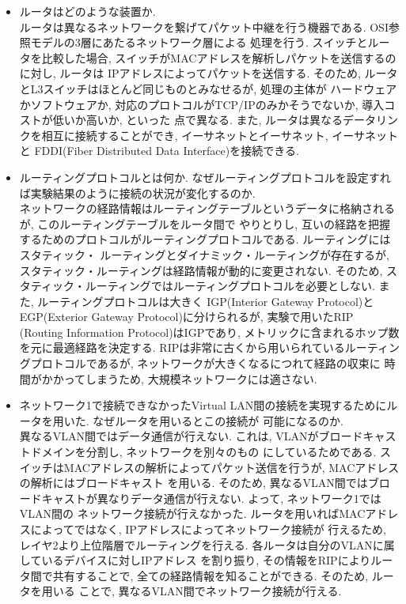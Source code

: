 \documentclass{jsarticle}
\begin{document}
\begin{itemize}
	\item ルータはどのような装置か. \\
		ルータは異なるネットワークを繋げてパケット中継を行う機器である. OSI参照モデルの3層にあたるネットワーク層による
		処理を行う. スイッチとルータを比較した場合, スイッチがMACアドレスを解析しパケットを送信するのに対し, ルータは
		IPアドレスによってパケットを送信する. そのため, ルータとL3スイッチはほとんど同じものとみなせるが, 処理の主体が
		ハードウェアかソフトウェアか, 対応のプロトコルがTCP/IPのみかそうでないか, 導入コストが低いか高いか, といった
		点で異なる. また, ルータは異なるデータリンクを相互に接続することができ, イーサネットとイーサネット, イーサネットと
		FDDI(Fiber Distributed Data Interface)を接続できる. \\
	
	\item ルーティングプロトコルとは何か. なぜルーティングプロトコルを設定すれば実験結果のように接続の状況が変化するのか. \\
		ネットワークの経路情報はルーティングテーブルというデータに格納されるが, このルーティングテーブルをルータ間で
		やりとりし, 互いの経路を把握するためのプロトコルがルーティングプロトコルである. ルーティングにはスタティック・
		ルーティングとダイナミック・ルーティングが存在するが, スタティック・ルーティングは経路情報が動的に変更されない. 
		そのため, スタティック・ルーティングではルーティングプロトコルを必要としない. また, ルーティングプロトコルは大きく
		IGP(Interior Gateway Protocol)とEGP(Exterior Gateway Protocol)に分けられるが, 実験で用いたRIP
		(Routing Information Protocol)はIGPであり, メトリックに含まれるホップ数を元に最適経路を決定する. 
		RIPは非常に古くから用いられているルーティングプロトコルであるが, ネットワークが大きくなるにつれて経路の収束に
		時間がかかってしまうため, 大規模ネットワークには適さない. \\
	
	\item ネットワーク1で接続できなかったVirtual LAN間の接続を実現するためにルータを用いた. なぜルータを用いるとこの接続が
		可能になるのか. \\
		異なるVLAN間ではデータ通信が行えない. これは, VLANがブロードキャストドメインを分割し, ネットワークを別々のもの
		にしているためである. スイッチはMACアドレスの解析によってパケット送信を行うが, MACアドレスの解析にはブロードキャスト
		を用いる. そのため, 異なるVLAN間ではブロードキャストが異なりデータ通信が行えない. よって, ネットワーク1ではVLAN間の
		ネットワーク接続が行えなかった. ルータを用いればMACアドレスによってではなく, IPアドレスによってネットワーク接続が
		行えるため, レイヤ2より上位階層でルーティングを行える. 各ルータは自分のVLANに属しているデバイスに対しIPアドレス
		を割り振り, その情報をRIPによりルータ間で共有することで, 全ての経路情報を知ることができる. そのため, ルータを用いる
		ことで, 異なるVLAN間でネットワーク接続が行える. 
		
\end{itemize}
\end{document}
